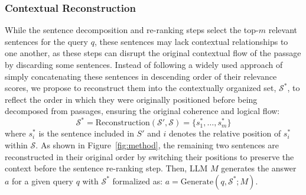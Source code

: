 

\subsubsection{Contextual Reconstruction}

While the sentence decomposition and re-ranking steps select the top-$m$ relevant sentences for the query $q$, these sentences may lack contextual relationships to one another, as these steps can disrupt the original contextual flow of the passage by discarding some sentences.
Instead of following a widely used approach of simply concatenating these sentences in descending order of their relevance scores, we propose to reconstruct them into the contextually organized set, $\mathcal{S}^*$, to reflect the order in which they were originally positioned before being decomposed from passages, ensuring the original coherence and logical flow:
\[
\mathcal{S}^* = \text{Reconstruction}(\mathcal{S'},\mathcal{S})=\{s^*_1,\ldots,s^*_m\}
\]
where $s^*_i$ is the sentence included in $S'$ and $i$ denotes the relative position of $s^*_i$ within $\mathcal{S}$. 
As shown in Figure~\ref{fig:method}, the remaining two sentences are reconstructed in their original order by switching their positions to preserve the context before the sentence re-ranking step.
Then, LLM $M$ generates the answer $a$ for a given query $q$ with $\mathcal{S}^*$ formalized as: $a=\text{Generate}(q,\mathcal{S}^*;M)$.



